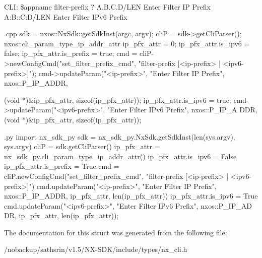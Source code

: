 CLI: \$appname filter-\/prefix ? A.B.C.D/LEN Enter Filter IP Prefix A:B::C:D/LEN Enter Filter IPv6 Prefix


\begin{DoxyCode}
 {.cpp}
       sdk = nxos::NxSdk::getSdkInst(argc, argv);
       cliP = sdk->getCliParser();
       nxos::cli_param_type_ip_addr_attr ip_pfx_attr = {0};
       ip_pfx_attr.is_ipv6 = false;
       ip_pfx_attr.is_prefix = true;
       cmd = cliP->newConfigCmd("set_filter_prefix_cmd",
                                "filter-prefix [<ip-prefix> | <ipv6-prefix>]");
       cmd->updateParam("<ip-prefix>", "Enter Filter IP Prefix", nxos::P_IP_ADDR,
      
                        (void *)&ip_pfx_attr, sizeof(ip_pfx_attr));
       ip_pfx_attr.is_ipv6 = true;
       cmd->updateParam("<ipv6-prefix>", "Enter Filter IPv6 Prefix", nxos::P_IP_A
      DDR,
                        (void *)&ip_pfx_attr, sizeof(ip_pfx_attr));
\end{DoxyCode}



\begin{DoxyCode}
 {.py}
       import nx_sdk_py
       sdk = nx_sdk_py.NxSdk.getSdkInst(len(sys.argv), sys.argv)
       cliP = sdk.getCliParser()
       ip_pfx_attr = nx_sdk_py.cli_param_type_ip_addr_attr()
       ip_pfx_attr.is_ipv6 = False
       ip_pfx_attr.is_prefix = True
       cmd = cliP.newConfigCmd("set_filter_prefix_cmd",
                               "filter-prefix [<ip-prefix> | <ipv6-prefix>]")
       cmd.updateParam("<ip-prefix>", "Enter Filter IP Prefix", nxos::P_IP_ADDR,
                       ip_pfx_attr, len(ip_pfx_attr))
       ip_pfx_attr.is_ipv6 = True
       cmd.updateParam("<ipv6-prefix>", "Enter Filter IPv6 Prefix", nxos::P_IP_AD
      DR,
                       ip_pfx_attr, len(ip_pfx_attr));
\end{DoxyCode}
 

The documentation for this struct was generated from the following file:\begin{DoxyCompactItemize}
\item 
/nobackup/sathsrin/v1.5/NX-\/SDK/include/types/nx\_\-cli.h\end{DoxyCompactItemize}
